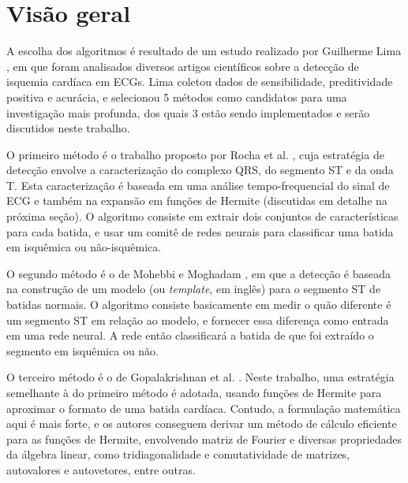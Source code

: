 
\section{Visão geral}
\label{sec:section1}

A escolha dos algoritmos é resultado de um estudo realizado por Guilherme Lima \cite{Lima01}, em que foram analisados diversos artigos científicos sobre a detecção de isquemia cardíaca em ECGs. Lima coletou dados de sensibilidade, preditividade positiva e acurácia, e selecionou 5 métodos como candidatos para uma investigação mais profunda, dos quais 3 estão sendo implementados e serão discutidos neste trabalho.

O primeiro método é o trabalho proposto por Rocha et al. \cite{Rocha10}, cuja estratégia de detecção envolve a caracterização do complexo QRS, do segmento ST e da onda T. Esta caracterização é baseada em uma análise tempo-frequencial do sinal de ECG e também na expansão em funções de Hermite (discutidas em detalhe na próxima seção). O algoritmo consiste em extrair dois conjuntos de características para cada batida, e usar um comitê de redes neurais para classificar uma batida em isquêmica ou não-isquêmica.

O segundo método é o de Mohebbi e Moghadam \cite{Mohebbi07}, em que a detecção é baseada na construção de um modelo (ou \emph{template}, em inglês) para o segmento ST de batidas normais. O algoritmo consiste basicamente em medir o quão diferente é um segmento ST em relação ao modelo, e fornecer essa diferença como entrada em uma rede neural. A rede então classificará a batida de que foi extraído o segmento em isquêmica ou não.

O terceiro método é o de Gopalakrishnan et al. \cite{Gopalak04}. Neste trabalho, uma estratégia semelhante à do primeiro método é adotada, usando funções de Hermite para aproximar o formato de uma batida cardíaca. Contudo, a formulação matemática aqui é mais forte, e os autores conseguem derivar um método de cálculo eficiente para as funções de Hermite, envolvendo matriz de Fourier e diversas propriedades da álgebra linear, como tridiagonalidade e comutatividade de matrizes, autovalores e autovetores, entre outras.